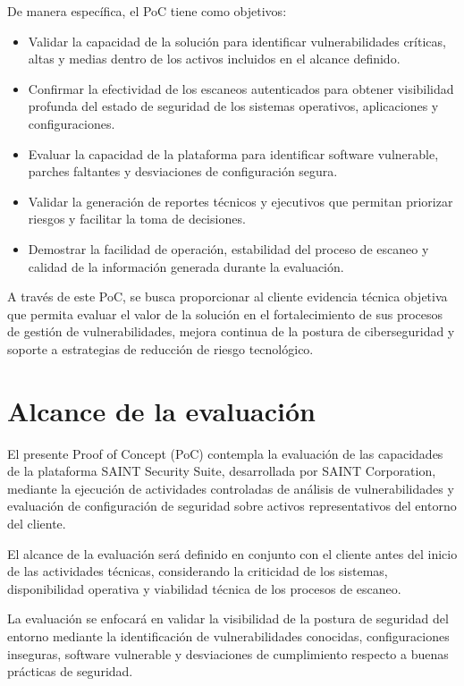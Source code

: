 \documentclass[a4paper]{article}
\begin{document}
    De manera específica, el PoC tiene como objetivos:
    \begin{itemize}
        \item Validar la capacidad de la solución para identificar vulnerabilidades críticas, altas y medias dentro de los activos incluidos en el alcance definido.
        \item Confirmar la efectividad de los escaneos autenticados para obtener visibilidad profunda del estado de seguridad de los sistemas operativos, aplicaciones y configuraciones.
        \item Evaluar la capacidad de la plataforma para identificar software vulnerable, parches faltantes y desviaciones de configuración segura.
        \item Validar la generación de reportes técnicos y ejecutivos que permitan priorizar riesgos y facilitar la toma de decisiones.
        \item Demostrar la facilidad de operación, estabilidad del proceso de escaneo y calidad de la información generada durante la evaluación.
    \end{itemize}
    A través de este PoC, se busca proporcionar al cliente evidencia técnica objetiva que permita evaluar el valor de la solución en el fortalecimiento de sus procesos de gestión de vulnerabilidades, mejora continua de la postura de ciberseguridad y soporte a estrategias de reducción de riesgo tecnológico.
    
    \newpage

    \section{Alcance de la evaluación}
    El presente Proof of Concept (PoC) contempla la evaluación de las capacidades de la plataforma SAINT Security Suite, desarrollada por SAINT Corporation, mediante la ejecución de actividades controladas de análisis de vulnerabilidades y evaluación de configuración de seguridad sobre activos representativos del entorno del cliente.

    El alcance de la evaluación será definido en conjunto con el cliente antes del inicio de las actividades técnicas, considerando la criticidad de los sistemas, disponibilidad operativa y viabilidad técnica de los procesos de escaneo.

    La evaluación se enfocará en validar la visibilidad de la postura de seguridad del entorno mediante la identificación de vulnerabilidades conocidas, configuraciones inseguras, software vulnerable y desviaciones de cumplimiento respecto a buenas prácticas de seguridad.
\end{document}

